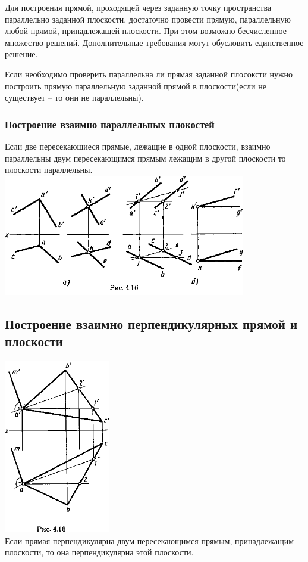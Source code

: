 \documentclass[a4paper, 12pt]{article}
\begin{document}
Для построения прямой, проходящей через заданную точку пространства параллельно заданной плоскости, достаточно провести прямую, параллельную любой прямой, принадлежащей плоскости.
При этом возможно бесчисленное множество решений. Дополнительные требования могут обусловить единственное решение.

Если необходимо проверить параллельна ли прямая заданной плосоксти нужно построить прямую параллельную заданной прямой в плоскости(если не существует -- то они не параллельны).

\subsubsection{Построение взаимно параллельных плокостей}

Если две пересекающиеся прямые, лежащие в одной плоскости, взаимно параллельны двум пересекающимся прямым лежащим в другой плоскости то плоскости параллельны.\\
\includegraphics{img/442.png}\\

\subsection{Построение взаимно перпендикулярных прямой и плоскости}

\quad \quad \quad \quad \quad \quad \quad \quad \includegraphics{img/451.png}\\
Если прямая перпендикулярна двум пересекающимся прямым, принадлежащим плоскости, то она перпендикулярна этой плоскости.\\
\end{document}
